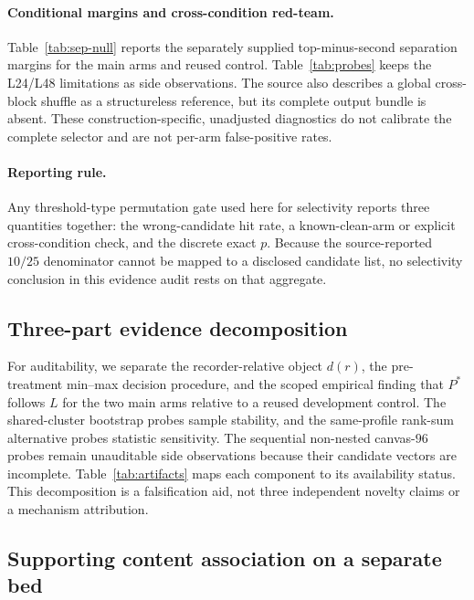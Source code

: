 \documentclass{article}
\begin{document}
\paragraph{Conditional margins and cross-condition red-team.}
Table~\ref{tab:sep-null} reports the separately supplied top-minus-second
separation margins for the main arms and reused control.  Table~\ref{tab:probes}
keeps the L24/L48 limitations as side observations.  The source also describes a
global cross-block shuffle as a structureless reference, but its complete output
bundle is absent.  These construction-specific, unadjusted diagnostics do not
calibrate the complete selector and are not per-arm false-positive rates.

\paragraph{Reporting rule.}
Any threshold-type permutation gate used here for selectivity reports three
quantities together: the wrong-candidate hit rate, a known-clean-arm or explicit
cross-condition check, and the discrete exact $p$.  Because the source-reported
$10/25$ denominator cannot be mapped to a disclosed candidate list, no
selectivity conclusion in this evidence audit rests on that aggregate.

\subsection{Three-part evidence decomposition}\label{sec:novelty}

For auditability, we separate the recorder-relative object $d(r)$, the
pre-treatment min--max decision procedure, and the scoped empirical finding that
$P^*$ follows $L$ for the two main arms relative to a reused development control.
The shared-cluster bootstrap
probes sample stability, and the same-profile rank-sum alternative probes
statistic sensitivity. The sequential non-nested canvas-$96$ probes remain
unauditable side observations because their candidate vectors are incomplete.
Table~\ref{tab:artifacts} maps each component to
its availability status. This decomposition is a falsification aid, not three independent
novelty claims or a mechanism attribution.

\subsection{Supporting content association on a separate bed}\label{sec:content}
\end{document}
